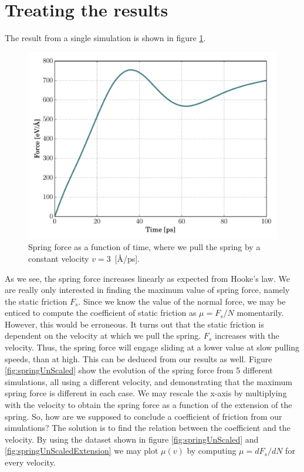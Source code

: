 \documentclass[twoside,english]{uiofysmaster}
\begin{document}
\section{Treating the results}
The result from a single simulation is shown in figure \ref{fig:springSingle_v3}.
\begin{figure}
	\centering
	\includegraphics[width=0.7\linewidth]{figures/friction/scalingCoeffisient/single_v3}
	\caption{Spring force as a function of time, where we pull the spring by a constant velocity $v=3$~[\AA/ps].}
	\label{fig:springSingle_v3}
\end{figure}
\noindent
As we see, the spring force increases linearly as expected from Hooke's law. 
We are really only interested in finding the maximum value of spring force, namely the static friction $F_s$.
Since we know the value of the normal force, we may be enticed to compute the coefficient of static friction as $\mu=F_ s/N$ momentarily. 
However, this would be erroneous. 
It turns out that the static friction is dependent on the velocity at which we pull the spring. 
$F_s$ increases with the velocity.
Thus, the spring force will engage sliding at a lower value at slow pulling speeds, than at high.
This can be deduced from our results as well. 
Figure \ref{fig:springUnScaled} show the evolution of the spring force from 5 different simulations, all using a different velocity, and demonstrating that the maximum spring force is different in each case. 
We may rescale the x-axis by multiplying with the velocity to obtain the spring force as a function of the extension of the spring.  
So, how are we supposed to conclude a coefficient of friction from our simulations? 
The solution is to find the relation between the coefficient and the velocity.
By using the dataset shown in figure \ref{fig:springUnScaled} and \ref{fig:springUnScaledExtension} we may plot $\mu(v)$ by computing $\mu = dF_s/dN$ for every velocity.
\end{document}
